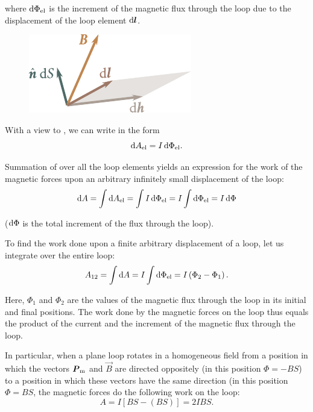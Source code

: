 \noindent
where $\mathrm{d}\Phi_{\text{el}}$ is the increment of the magnetic flux through the loop due to the displacement of the loop element $\mathrm{d}\boldsymbol{l}$.

\begin{figure}[t]
	\begin{center}
		\includegraphics[scale=0.98]{figures/ch_06/fig_6_23.pdf}
		\caption[]{}
		\label{fig:6_23}
	\end{center}
	\vspace{-0.9cm}
\end{figure}

With a view to , we can write  in the form
\begin{equation}\label{eq:6_92}
    \mathrm{d}A_{\text{el}} = I\, \mathrm{d}\Phi_{\text{el}}.
\end{equation}

\noindent
Summation of  over all the loop elements yields an expression for the work of the magnetic forces upon an arbitrary infinitely small displacement of the loop:
\begin{equation}\label{eq:6_93}
    \mathrm{d} A = \int \mathrm{d}A_{\text{el}} = \int I \, \mathrm{d}\Phi_{\text{el}} = I \int \mathrm{d}\Phi_{\text{el}} = I\, \mathrm{d}\Phi
\end{equation}

\noindent
($\mathrm{d}\Phi$ is the total increment of the flux through the loop).

To find the work done upon a finite arbitrary displacement of a loop, let us integrate  over the entire loop:
\begin{equation}\label{eq:6_94}
    A_{12} = \int \mathrm{d} A = I \int \mathrm{d}\Phi_{\text{el}} = I \left(\Phi_2 - \Phi_1\right).
\end{equation}

\noindent
Here, $\Phi_1$ and $\Phi_2$ are the values of the magnetic flux through the loop in its initial and final positions. The work done by the magnetic forces on the loop thus equals the product of the current and the increment of the magnetic flux through the loop.

In particular, when a plane loop rotates in a homogeneous field from a position in which the vectors $\boldsymbol{P}_{\text{m}}$ and $\vec{B}$ are directed oppositely (in this position $\Phi=-BS$) to a position in which these vectors have the same direction (in this position $\Phi=BS$, the magnetic
forces do the following work on the loop:
\begin{equation*}
    A = I [BS - (BS)] = 2 I B S.
\end{equation*}

